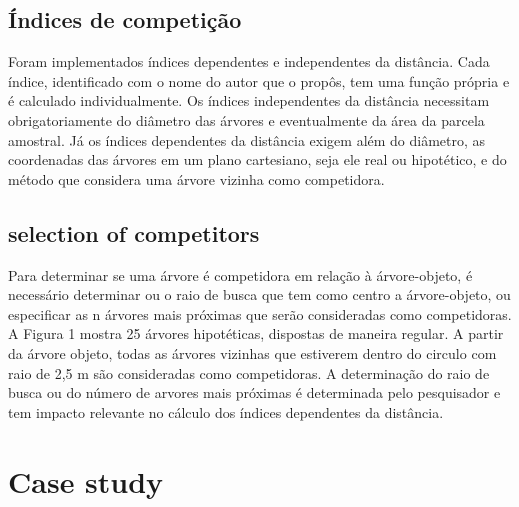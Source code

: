 \documentclass[article]{jss}
\begin{document}
\subsection{Índices de competição}\label{indices-de-competicao}

Foram implementados índices dependentes e independentes da distância.
Cada índice, identificado com o nome do autor que o propôs, tem uma
função própria e é calculado individualmente. Os índices independentes
da distância necessitam obrigatoriamente do diâmetro das árvores e
eventualmente da área da parcela amostral. Já os índices dependentes da
distância exigem além do diâmetro, as coordenadas das árvores em um
plano cartesiano, seja ele real ou hipotético, e do método que considera
uma árvore vizinha como competidora.

\subsection{selection of competitors}\label{selection-of-competitors}

Para determinar se uma árvore é competidora em relação à árvore-objeto,
é necessário determinar ou o raio de busca que tem como centro a
árvore-objeto, ou especificar as n árvores mais próximas que serão
consideradas como competidoras. A Figura 1 mostra 25 árvores
hipotéticas, dispostas de maneira regular. A partir da árvore objeto,
todas as árvores vizinhas que estiverem dentro do circulo com raio de
2,5 m são consideradas como competidoras. A determinação do raio de
busca ou do número de arvores mais próximas é determinada pelo
pesquisador e tem impacto relevante no cálculo dos índices dependentes
da distância.

\section{Case study}\label{case-study}
\end{document}
